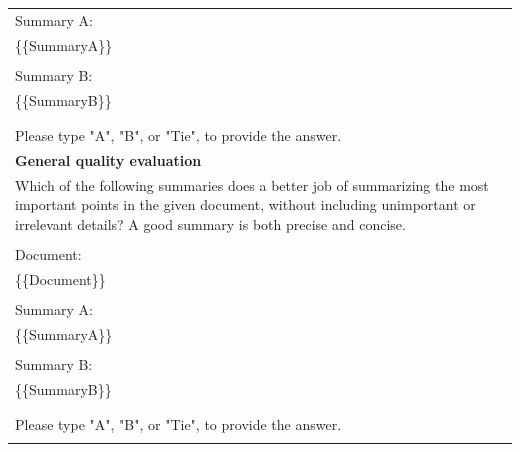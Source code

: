 \documentclass[11pt]{article}
\begin{document}
\begin{table}[htbp]
{\begin{tabular}{p{13cm}}
\\
Summary A:\\
\{\{SummaryA\}\}\\
\\
Summary B:\\
\{\{SummaryB\}\}\\
\\
\\
Please type "A", "B", or "Tie", to provide the answer.\\ \hline
\textbf{General quality evaluation}\\ \hline
Which of the following summaries does a better job of summarizing the most important points in the given document, without including unimportant or irrelevant details? A good summary is both precise and concise. \\
\\
Document: \\
\{\{Document\}\} \\
\\
Summary A: \\
\{\{SummaryA\}\} \\
\\
Summary B: \\
\{\{SummaryB\}\} \\
\\
\\
Please type "A", "B", or "Tie", to provide the answer.\\
\Xhline{1pt}
\end{tabular}
}
\end{table}
\end{document}
